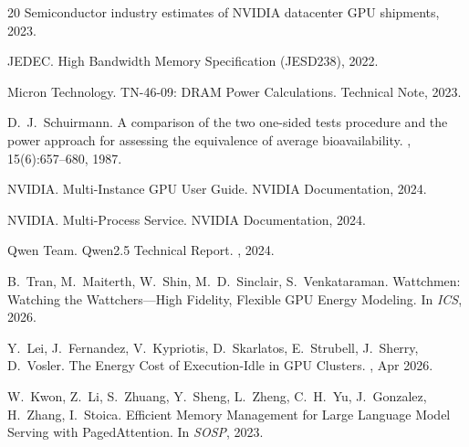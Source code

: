 \documentclass[sigconf,nonacm]{acmart}
\begin{document}
\begin{thebibliography}{20}
Semiconductor industry estimates of NVIDIA datacenter GPU shipments, 2023.

JEDEC.
 High Bandwidth Memory Specification ({JESD238}), 2022.

Micron Technology.
\newblock TN-46-09: DRAM Power Calculations.
\newblock Technical Note, 2023.

D.~J.~Schuirmann.
\newblock A comparison of the two one-sided tests procedure and the power approach for assessing the equivalence of average bioavailability.
, 15(6):657--680, 1987.

NVIDIA.
\newblock Multi-Instance GPU User Guide.
\newblock NVIDIA Documentation, 2024.

NVIDIA.
\newblock Multi-Process Service.
\newblock NVIDIA Documentation, 2024.

Qwen Team.
\newblock Qwen2.5 Technical Report.
, 2024.

B.~Tran, M.~Maiterth, W.~Shin, M.~D.~Sinclair, S.~Venkataraman.
\newblock Wattchmen: Watching the Wattchers---High Fidelity, Flexible {GPU} Energy Modeling.
\newblock In {\em ICS}, 2026.

Y.~Lei, J.~Fernandez, V.~Kypriotis, D.~Skarlatos, E.~Strubell, J.~Sherry, D.~Vosler.
\newblock The Energy Cost of Execution-Idle in {GPU} Clusters.
, Apr 2026.

W.~Kwon, Z.~Li, S.~Zhuang, Y.~Sheng, L.~Zheng, C.~H.~Yu, J.~Gonzalez, H.~Zhang, I.~Stoica.
\newblock Efficient Memory Management for Large Language Model Serving with {PagedAttention}.
\newblock In {\em SOSP}, 2023.

\end{thebibliography}
\end{document}
